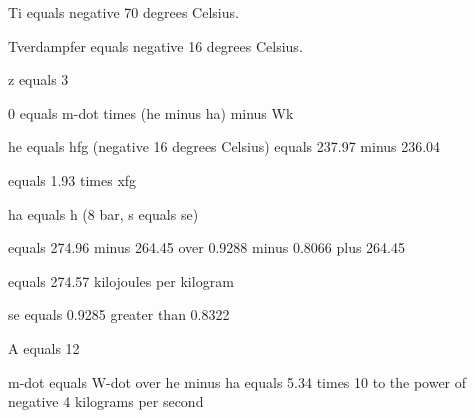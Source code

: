 Ti equals negative 70 degrees Celsius.

Tverdampfer equals negative 16 degrees Celsius.

z equals 3

0 equals m-dot times (he minus ha) minus Wk

he equals hfg (negative 16 degrees Celsius) equals 237.97 minus 236.04

equals 1.93 times xfg

ha equals h (8 bar, s equals se)

equals 274.96 minus 264.45 over 0.9288 minus 0.8066 plus 264.45

equals 274.57 kilojoules per kilogram

se equals 0.9285 greater than 0.8322

A equals 12

m-dot equals W-dot over he minus ha equals 5.34 times 10 to the power of negative 4 kilograms per second
